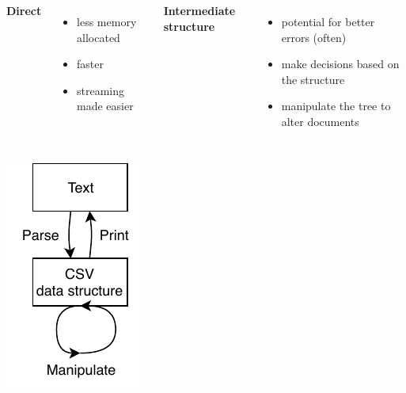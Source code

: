 \documentclass[UKenglish,usenames,dvipsnames,svgnames,table,aspectratio=169,mathserif]{beamer}
\newcommand{\nl}{\vspace{\baselineskip}}
\begin{document}
\begin{frame}
\begin{columns}
{\bf Direct}
\begin{itemize}
\item less memory allocated
\item faster
\item streaming made easier
\end{itemize}

{\bf Intermediate structure}

\begin{itemize}
\item potential for better errors (often)
\item make decisions based on the structure
\item manipulate the tree to alter documents
\end{itemize}
\end{columns}
\end{frame}


\begin{frame}
\begin{center}

\includegraphics[scale=1.2]{pipeline-parse-print.pdf}
\end{center}
\end{frame}






\end{document}

